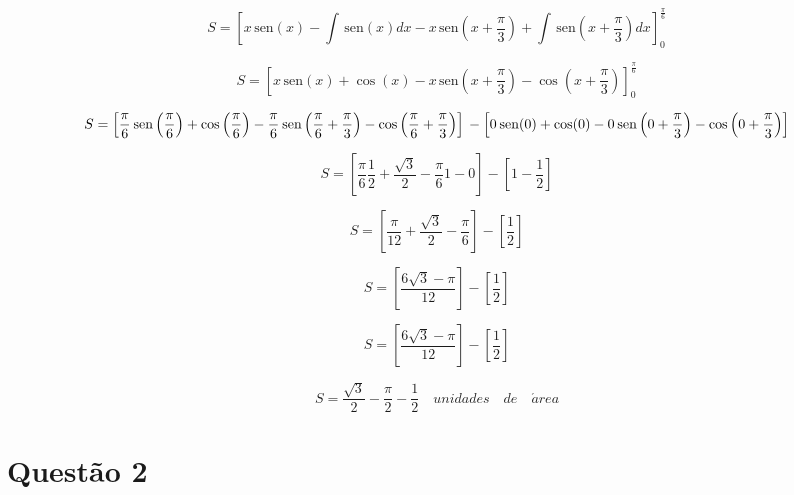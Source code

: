 \documentclass[10pt,a4paper]{article}
\newcommand{\sen}{\hspace{2pt}\textrm{sen}}
\begin{document}
	\begin{equation*}
		S = \left[ x \sen (x) - \int \sen (x) dx - x \sen \left( x + \frac{\pi}{3} \right) + \int \sen \left( x + \frac{\pi}{3} \right) dx \right]_{0}^{\frac{\pi}{6}}
	\end{equation*}
	
	\begin{equation*}
		S = \left[ x \sen (x) +  \cos (x) - x \sen \left( x + \frac{\pi}{3} \right) - \cos \left( x + \frac{\pi}{3} \right) \right]_{0}^{\frac{\pi}{6}}
	\end{equation*}
	
	\begin{equation*}
		S = \left[ \frac{\pi}{6} \sen \left(\frac{\pi}{6}\right) +  \cos \left(\frac{\pi}{6}\right) - \frac{\pi}{6} \sen \left( \frac{\pi}{6} + \frac{\pi}{3} \right) - \cos \left( \frac{\pi}{6} + \frac{\pi}{3} \right) \right] \\- \left[ 0 \sen (0) +  \cos (0) - 0 \sen \left( 0 + \frac{\pi}{3} \right) - \cos \left( 0 + \frac{\pi}{3} \right) \right]
	\end{equation*}
	
	\begin{equation*}
		S = \left[ \frac{\pi}{6} \frac{1}{2} + \frac{\sqrt{3}}{2} - \frac{\pi}{6} 1 - 0 \right] - \left[ 1 - \frac{1}{2} \right]
	\end{equation*}
	
	\begin{equation*}
	S = \left[ \frac{\pi}{12} + \frac{\sqrt{3}}{2} - \frac{\pi}{6} \right] - \left[ \frac{1}{2} \right]
	\end{equation*}
	
	\begin{equation*}
	S = \left[ \frac{6\sqrt{3} - \pi}{12} \right] - \left[ \frac{1}{2} \right]
	\end{equation*}
	
	\begin{equation*}
		S = \left[ \frac{6\sqrt{3} - \pi}{12} \right] - \left[ \frac{1}{2} \right]
	\end{equation*}
	
	\begin{equation*}
		S = \frac{\sqrt{3}}{2} - \frac{\pi}{2} - \frac{1}{2} \quad unidades\quad de \quad \acute{a}rea
	\end{equation*}
	
	\section*{Questão 2}
	
\end{document}
